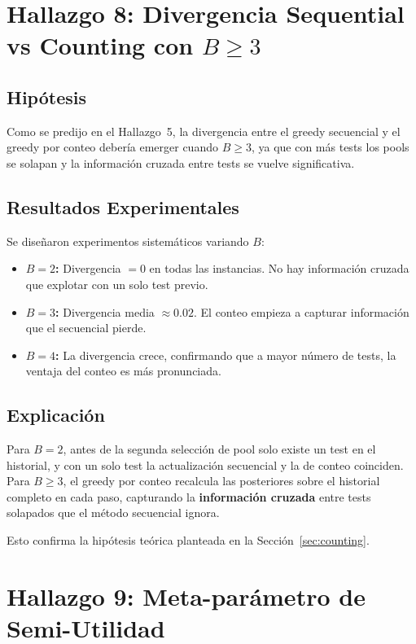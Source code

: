 \documentclass[11pt, a4paper]{article}
\begin{document}
\section{Hallazgo 8: Divergencia Sequential vs Counting con $B \geq 3$}

\subsection{Hip\'otesis}
Como se predijo en el Hallazgo~5, la divergencia entre el greedy secuencial
y el greedy por conteo deber\'ia emerger cuando $B \geq 3$, ya que con m\'as
tests los pools se solapan y la informaci\'on cruzada entre tests se vuelve
significativa.

\subsection{Resultados Experimentales}
Se dise\~naron experimentos sistem\'aticos variando $B$:

\begin{itemize}[nosep]
    \item \textbf{$B = 2$:} Divergencia $= 0$ en todas las instancias.
    No hay informaci\'on cruzada que explotar con un solo test previo.
    \item \textbf{$B = 3$:} Divergencia media $\approx 0.02$.
    El conteo empieza a capturar informaci\'on que el secuencial pierde.
    \item \textbf{$B = 4$:} La divergencia crece, confirmando que a mayor
    n\'umero de tests, la ventaja del conteo es m\'as pronunciada.
\end{itemize}

\subsection{Explicaci\'on}
Para $B = 2$, antes de la segunda selecci\'on de pool solo existe un test en
el historial, y con un solo test la actualizaci\'on secuencial y la de conteo
coinciden. Para $B \geq 3$, el greedy por conteo recalcula las posteriores
sobre el historial completo en cada paso, capturando la \textbf{informaci\'on
cruzada} entre tests solapados que el m\'etodo secuencial ignora.

Esto confirma la hip\'otesis te\'orica planteada en la Secci\'on~\ref{sec:counting}.

\section{Hallazgo 9: Meta-par\'ametro de Semi-Utilidad}
\end{document}
